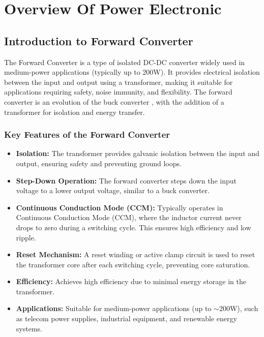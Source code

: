\section{Overview Of Power Electronic}
\subsection{Introduction to Forward Converter} 
The Forward Converter is a type of isolated DC-DC converter widely used in medium-power applications (typically up to 200W). It provides electrical isolation between the input and output using a transformer, making it suitable for applications requiring safety, noise immunity, and flexibility. The forward converter is an evolution of the buck converter , with the addition of a transformer for isolation and energy transfer.
\subsubsection*{Key Features of the Forward Converter}
\begin{itemize}
    \item \textbf{Isolation:} The transformer provides galvanic isolation between the input and output, ensuring safety and preventing ground loops.
    
    \item \textbf{Step-Down Operation:} The forward converter steps down the input voltage to a lower output voltage, similar to a buck converter.
    
    \item \textbf{Continuous Conduction Mode (CCM):} Typically operates in Continuous Conduction Mode (CCM), where the inductor current never drops to zero during a switching cycle. This ensures high efficiency and low ripple.
    
    \item \textbf{Reset Mechanism:} A reset winding or active clamp circuit is used to reset the transformer core after each switching cycle, preventing core saturation.
    
    \item \textbf{Efficiency:} Achieves high efficiency due to minimal energy storage in the transformer.
    
    \item \textbf{Applications:} Suitable for medium-power applications (up to $\sim$200W), such as telecom power supplies, industrial equipment, and renewable energy systems.
\end{itemize}

